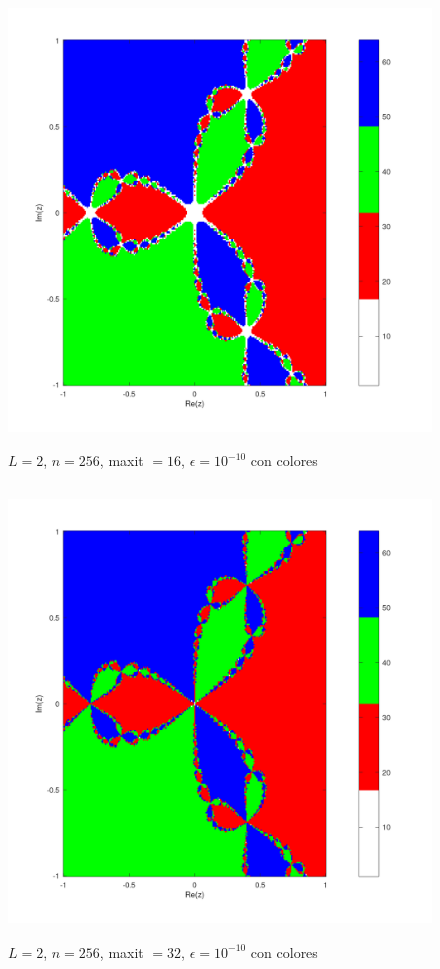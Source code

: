 \documentclass{article} %
\begin{document}
\begin{figure}[H]
    \centering
    \includegraphics[width=152mm, height=120mm]{images/L2n256maxit16e10-10color.png}
    \caption{$L=2$, $n=256$, maxit $=16$, $\epsilon=10^{-10}$ con colores}
\end{figure}

\begin{figure}[H]
    \centering
    \includegraphics[width=152mm, height=120mm]{images/L2n256maxit32e10-10color.png}
    \caption{$L=2$, $n=256$, maxit $=32$, $\epsilon=10^{-10}$ con colores}
\end{figure}
\end{document}
